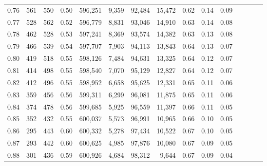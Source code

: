 \begin{tabular}{rrrcrrrrrrrrrrr}
0.76 &     561 &    550 &                                       0.50 &  596,251 &    9,359 &   92,484 &   15,472 &  0.62 &  0.14 &                         0.09 \\
0.77 &     528 &    562 &                                       0.52 &  596,779 &    8,831 &   93,046 &   14,910 &  0.63 &  0.14 &                         0.08 \\
0.78 &     462 &    528 &                                       0.53 &  597,241 &    8,369 &   93,574 &   14,382 &  0.63 &  0.13 &                         0.08 \\
0.79 &     466 &    539 &                                       0.54 &  597,707 &    7,903 &   94,113 &   13,843 &  0.64 &  0.13 &                         0.07 \\
0.80 &     419 &    518 &                                       0.55 &  598,126 &    7,484 &   94,631 &   13,325 &  0.64 &  0.12 &                         0.07 \\
0.81 &     414 &    498 &                                       0.55 &  598,540 &    7,070 &   95,129 &   12,827 &  0.64 &  0.12 &                         0.07 \\
0.82 &     412 &    496 &                                       0.55 &  598,952 &    6,658 &   95,625 &   12,331 &  0.65 &  0.11 &                         0.06 \\
0.83 &     359 &    456 &                                       0.56 &  599,311 &    6,299 &   96,081 &   11,875 &  0.65 &  0.11 &                         0.06 \\
0.84 &     374 &    478 &                                       0.56 &  599,685 &    5,925 &   96,559 &   11,397 &  0.66 &  0.11 &                         0.05 \\
0.85 &     352 &    432 &                                       0.55 &  600,037 &    5,573 &   96,991 &   10,965 &  0.66 &  0.10 &                         0.05 \\
0.86 &     295 &    443 &                                       0.60 &  600,332 &    5,278 &   97,434 &   10,522 &  0.67 &  0.10 &                         0.05 \\
0.87 &     293 &    442 &                                       0.60 &  600,625 &    4,985 &   97,876 &   10,080 &  0.67 &  0.09 &                         0.05 \\
0.88 &     301 &    436 &                                       0.59 &  600,926 &    4,684 &   98,312 &    9,644 &  0.67 &  0.09 &                         0.04 \\

\end{tabular}
